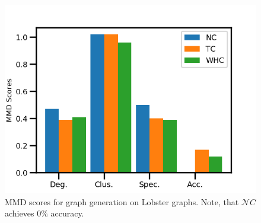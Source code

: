 \begin{figure}
    \centering
    \includegraphics[width=0.9\linewidth]{lobster_graph_gen.png}
    \vspace{-15pt}
    \caption{MMD scores for graph generation on Lobster graphs. Note, that $\mathcal{N}C$ achieves $0\%$ accuracy.}
    \label{fig:lobster_graph_gen}
    \vspace{-15pt}
\end{figure}


